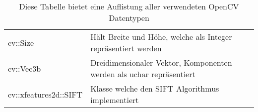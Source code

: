 \begin{table}[]
\begin{tabularx}{\textwidth}{ |l|X| }
cv::Size              & Hält Breite und Höhe, welche als Integer repräsentiert werden \cite{opencv_doc_size}                                                             \\
cv::Vec3b             & Dreidimensionaler Vektor, Komponenten werden als uchar repräsentiert \cite{opencv_doc_vec3b}                                                     \\
cv::xfeatures2d::SIFT & Klasse welche den SIFT Algorithmus implementiert \cite{opencv_doc_sift}                                                                         
\end{tabularx}
\caption{Diese Tabelle bietet eine Auflistung aller verwendeten OpenCV Datentypen}
\label{tab:opencv-datatypes}
\end{table}
